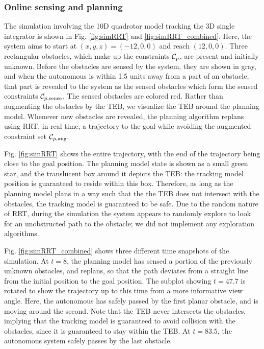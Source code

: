\subsubsection{Online sensing and planning}
The simulation involving the 10D quadrotor model tracking the 3D single integrator is shown in Fig. \ref{fig:simRRT} and \ref{fig:simRRT_combined}.
Here, the system aims to start at $(x,y,z) = (-12, 0, 0)$ and reach $(12, 0, 0)$. 
Three rectangular obstacles, which make up the constraints $\mathcal C_p$, are present and initially unknown.
Before the obstacles are sensed by the system, they are shown in gray, and when the autonomous is within 1.5 units away from a part of an obstacle, that part is revealed to the system as the sensed obstacles which form the sensed constraints $\mathcal C_{p,\text{sense}}$.
The sensed obstacles are colored red.
Rather than augmenting the obstacles by the TEB, we visualize the TEB around the planning model.
Whenever new obstacles are revealed, the planning algorithm replans using RRT, in real time, a trajectory to the goal while avoiding the augmented constraint set $\mathcal C_{p,\text{aug}}$.

Fig. \ref{fig:simRRT} shows the entire trajectory, with the end of the trajectory being close to the goal position.
The planning model state is shown as a small green star, and the translucent box around it depicts the TEB: the tracking model position is guaranteed to reside within this box.
Therefore, as long as the planning model plans in a way such that the the TEB does not intersect with the obstacles, the tracking model is guaranteed to be safe.
Due to the random nature of RRT, during the simulation the system appears to randomly explore to look for an unobstructed path to the obstacle; we did not implement any exploration algorithms.

Fig. \ref{fig:simRRT_combined} shows three different time snapshots of the simulation.
At $t=8$, the planning model has sensed a portion of the previously unknown obstacles, and replans, so that the path deviates from a straight line from the initial position to the goal position.
The subplot showing $t = 47.7$ is rotated to show the trajectory up to this time from a more informative view angle.
Here, the autonomous has safely passed by the first planar obstacle, and is moving around the second. 
Note that the TEB never intersects the obstacles, implying that the tracking model is guaranteed to avoid collision with the obstacles, since it is guaranteed to stay within the TEB.
At $t=83.5$, the autonomous system safely passes by the last obstacle.

